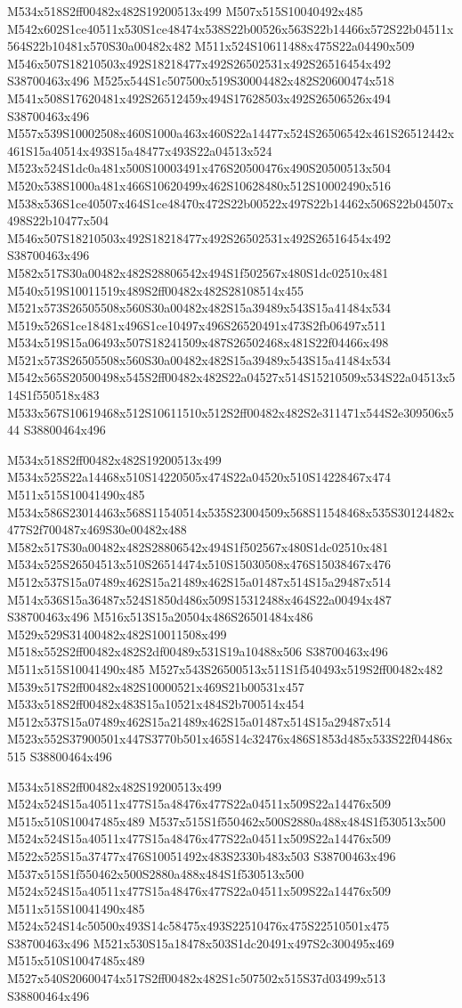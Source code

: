\documentclass{article}
\begin{document}
\begin{multicols}{2}
M534x518S2ff00482x482S19200513x499 M507x515S10040492x485 M542x602S1ce40511x530S1ce48474x538S22b00526x563S22b14466x572S22b04511x564S22b10481x570S30a00482x482 M511x524S10611488x475S22a04490x509 M546x507S18210503x492S18218477x492S26502531x492S26516454x492 S38700463x496 M525x544S1c507500x519S30004482x482S20600474x518 M541x508S17620481x492S26512459x494S17628503x492S26506526x494 S38700463x496 M557x539S10002508x460S1000a463x460S22a14477x524S26506542x461S26512442x461S15a40514x493S15a48477x493S22a04513x524 M523x524S1dc0a481x500S10003491x476S20500476x490S20500513x504 M520x538S1000a481x466S10620499x462S10628480x512S10002490x516 M538x536S1ce40507x464S1ce48470x472S22b00522x497S22b14462x506S22b04507x498S22b10477x504 M546x507S18210503x492S18218477x492S26502531x492S26516454x492 S38700463x496 M582x517S30a00482x482S28806542x494S1f502567x480S1dc02510x481 M540x519S10011519x489S2ff00482x482S28108514x455 M521x573S26505508x560S30a00482x482S15a39489x543S15a41484x534 M519x526S1ce18481x496S1ce10497x496S26520491x473S2fb06497x511 M534x519S15a06493x507S18241509x487S26502468x481S22f04466x498 M521x573S26505508x560S30a00482x482S15a39489x543S15a41484x534 M542x565S20500498x545S2ff00482x482S22a04527x514S15210509x534S22a04513x514S1f550518x483 M533x567S10619468x512S10611510x512S2ff00482x482S2e311471x544S2e309506x544 S38800464x496

M534x518S2ff00482x482S19200513x499 M534x525S22a14468x510S14220505x474S22a04520x510S14228467x474 M511x515S10041490x485 M534x586S23014463x568S11540514x535S23004509x568S11548468x535S30124482x477S2f700487x469S30e00482x488 M582x517S30a00482x482S28806542x494S1f502567x480S1dc02510x481 M534x525S26504513x510S26514474x510S15030508x476S15038467x476 M512x537S15a07489x462S15a21489x462S15a01487x514S15a29487x514 M514x536S15a36487x524S1850d486x509S15312488x464S22a00494x487 S38700463x496 M516x513S15a20504x486S26501484x486 M529x529S31400482x482S10011508x499 M518x552S2ff00482x482S2df00489x531S19a10488x506 S38700463x496 M511x515S10041490x485 M527x543S26500513x511S1f540493x519S2ff00482x482 M539x517S2ff00482x482S10000521x469S21b00531x457 M533x518S2ff00482x483S15a10521x484S2b700514x454 M512x537S15a07489x462S15a21489x462S15a01487x514S15a29487x514 M523x552S37900501x447S3770b501x465S14c32476x486S1853d485x533S22f04486x515 S38800464x496

M534x518S2ff00482x482S19200513x499 M524x524S15a40511x477S15a48476x477S22a04511x509S22a14476x509 M515x510S10047485x489 M537x515S1f550462x500S2880a488x484S1f530513x500 M524x524S15a40511x477S15a48476x477S22a04511x509S22a14476x509 M522x525S15a37477x476S10051492x483S2330b483x503 S38700463x496 M537x515S1f550462x500S2880a488x484S1f530513x500 M524x524S15a40511x477S15a48476x477S22a04511x509S22a14476x509 M511x515S10041490x485 M524x524S14c50500x493S14c58475x493S22510476x475S22510501x475 S38700463x496 M521x530S15a18478x503S1dc20491x497S2c300495x469 M515x510S10047485x489 M527x540S20600474x517S2ff00482x482S1c507502x515S37d03499x513 S38800464x496


\end{multicols}
\end{document}
